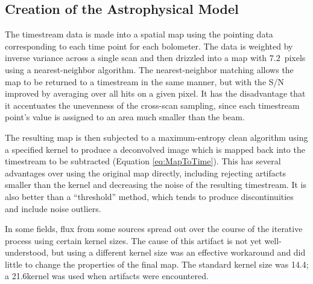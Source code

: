 \documentclass[12pt,preprint]{aastex}
\begin{document}
\subsection{Creation of the Astrophysical Model}

The timestream data is made into a spatial map using the pointing data
corresponding to each time point for each bolometer.  The data is
weighted by inverse variance across a single scan and then drizzled
into a map with $7.2$\arcsec\ pixels using a nearest-neighbor
algorithm.  The nearest-neighbor matching allows the map to be
returned to a timestream in the same manner, but with the S/N improved
by averaging over all hits on a given pixel.  It has the disadvantage
that it accentuates the unevenness of the cross-scan sampling, since
each timestream point's value is assigned to an area much smaller than
the beam.

The resulting map is then subjected to a maximum-entropy clean algorithm
\citep{hollis92} using a specified kernel to produce a deconvolved image which
is mapped back into the timestream to be subtracted (Equation
\ref{eq:MapToTime}).  This has several advantages over using the original map
directly, including rejecting artifacts smaller than the kernel and decreasing
the noise of the resulting timestream.  It is also better than a ``threshold''
method, which tends to produce discontinuities and include noise outliers.

In some fields, flux from some sources spread out over the course of the
iterative process using certain kernel sizes.  The cause of this artifact is
not yet well-understood, but using a different kernel size was an effective
workaround and did little to change the properties of the final map.  The
standard kernel size was 14.4\arcsec; a 21.6\arcsec kernel was used when
artifacts were encountered.

\setcounter{subfig}{1}
\renewcommand{\thefigure}{\arabic{figure}\alph{subfig}}
\end{document}
